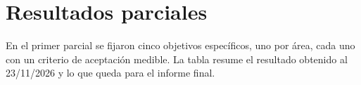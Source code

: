 \providecommand{\completar}[1]{\textcolor{red}{\textbf{[#1]}}}
\providecommand{\chipRP}[2]{\tikz[baseline=(c.base)]\node[fill=#1, text=white,
    rounded corners=2pt, inner sep=2.5pt, font=\scriptsize\bfseries\sffamily] (c) {#2};}
\providecommand{\estCUMPLIDO}{\chipRP{green!45!black}{CUMPLIDO}}
\providecommand{\estPARCIAL}{\chipRP{blue!65!black}{PARCIAL}}
\providecommand{\estPENDIENTE}{\chipRP{orange!85!black}{PENDIENTE}}

\section{Resultados parciales}
\label{sec:resultados}

En el primer parcial se fijaron cinco objetivos específicos, uno por área, cada
uno con un criterio de aceptación medible. La tabla resume el resultado
obtenido al 23/11/2026 y lo que queda para el informe final.

